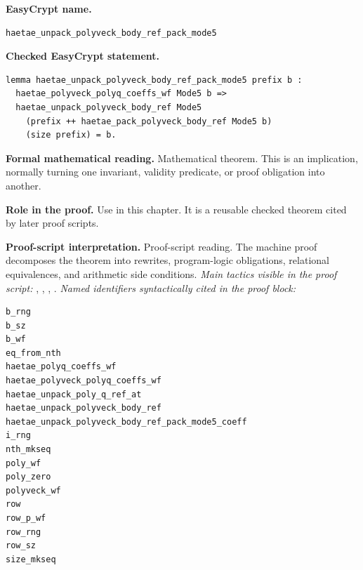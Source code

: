 \begin{formaltheorem}
\noindent\textbf{EasyCrypt name.}
\begin{lstlisting}[language=EasyCrypt,basicstyle=\ttfamily\scriptsize]
haetae_unpack_polyveck_body_ref_pack_mode5
\end{lstlisting}
\noindent\textbf{Checked EasyCrypt statement.}
\begin{lstlisting}[language=EasyCrypt,basicstyle=\ttfamily\scriptsize]
lemma haetae_unpack_polyveck_body_ref_pack_mode5 prefix b :
  haetae_polyveck_polyq_coeffs_wf Mode5 b =>
  haetae_unpack_polyveck_body_ref Mode5
    (prefix ++ haetae_pack_polyveck_body_ref Mode5 b)
    (size prefix) = b.
\end{lstlisting}
\noindent\textbf{Formal mathematical reading.}
Mathematical theorem. This is an implication, normally turning one invariant, validity predicate, or proof obligation into another.

\noindent\textbf{Role in the proof.}
Use in this chapter. It is a reusable checked theorem cited by later proof scripts.

\noindent\textbf{Proof-script interpretation.}
Proof-script reading. The machine proof decomposes the theorem into rewrites, program-logic obligations, relational equivalences, and arithmetic side conditions.
\emph{Main tactics visible in the proof script:} , , , .
\emph{Named identifiers syntactically cited in the proof block:}
\begin{lstlisting}[language=EasyCrypt,basicstyle=\ttfamily\scriptsize]
b_rng
b_sz
b_wf
eq_from_nth
haetae_polyq_coeffs_wf
haetae_polyveck_polyq_coeffs_wf
haetae_unpack_poly_q_ref_at
haetae_unpack_polyveck_body_ref
haetae_unpack_polyveck_body_ref_pack_mode5_coeff
i_rng
nth_mkseq
poly_wf
poly_zero
polyveck_wf
row
row_p_wf
row_rng
row_sz
size_mkseq
\end{lstlisting}

\end{formaltheorem}

